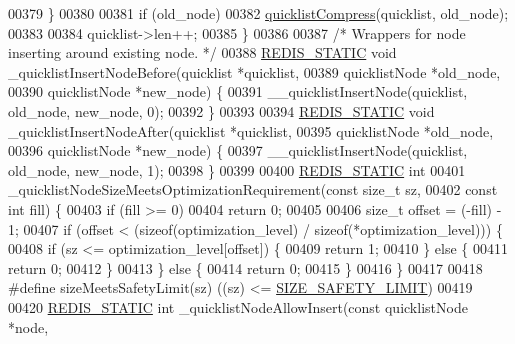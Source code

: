 \begin{DoxyCode}
{00379     \}
00380 
00381     \textcolor{keywordflow}{if} (old\_node)
00382         \hyperlink{quicklist_8c_a4711a946d258d25f4bedace1458a2a1c}{quicklistCompress}(quicklist, old\_node);
00383 
00384     quicklist->len++;
00385 \}
00386 
00387 \textcolor{comment}{/* Wrappers for node inserting around existing node. */}
00388 \hyperlink{quicklist_8c_a9c22c9c899458021930a552a4f94d317}{REDIS\_STATIC} \textcolor{keywordtype}{void} \_quicklistInsertNodeBefore(quicklist *quicklist,
00389                                              quicklistNode *old\_node,
00390                                              quicklistNode *new\_node) \{
00391     \_\_quicklistInsertNode(quicklist, old\_node, new\_node, 0);
00392 \}
00393 
00394 \hyperlink{quicklist_8c_a9c22c9c899458021930a552a4f94d317}{REDIS\_STATIC} \textcolor{keywordtype}{void} \_quicklistInsertNodeAfter(quicklist *quicklist,
00395                                             quicklistNode *old\_node,
00396                                             quicklistNode *new\_node) \{
00397     \_\_quicklistInsertNode(quicklist, old\_node, new\_node, 1);
00398 \}
00399 
00400 \hyperlink{quicklist_8c_a9c22c9c899458021930a552a4f94d317}{REDIS\_STATIC} \textcolor{keywordtype}{int}
00401 \_quicklistNodeSizeMeetsOptimizationRequirement(\textcolor{keyword}{const} size\_t sz,
00402                                                \textcolor{keyword}{const} \textcolor{keywordtype}{int} fill) \{
00403     \textcolor{keywordflow}{if} (fill >= 0)
00404         \textcolor{keywordflow}{return} 0;
00405 
00406     size\_t offset = (-fill) - 1;
00407     \textcolor{keywordflow}{if} (offset < (\textcolor{keyword}{sizeof}(optimization\_level) / \textcolor{keyword}{sizeof}(*optimization\_level))) \{
00408         \textcolor{keywordflow}{if} (sz <= optimization\_level[offset]) \{
00409             \textcolor{keywordflow}{return} 1;
00410         \} \textcolor{keywordflow}{else} \{
00411             \textcolor{keywordflow}{return} 0;
00412         \}
00413     \} \textcolor{keywordflow}{else} \{
00414         \textcolor{keywordflow}{return} 0;
00415     \}
00416 \}
00417 
00418 \textcolor{preprocessor}{#}\textcolor{preprocessor}{define} \textcolor{preprocessor}{sizeMeetsSafetyLimit}\textcolor{preprocessor}{(}\textcolor{preprocessor}{sz}\textcolor{preprocessor}{)} \textcolor{preprocessor}{(}\textcolor{preprocessor}{(}\textcolor{preprocessor}{sz}\textcolor{preprocessor}{)} \textcolor{preprocessor}{<=} \hyperlink{quicklist_8c_ae95e4d31b16c0e50720b8310df428c0e}{SIZE\_SAFETY\_LIMIT}\textcolor{preprocessor}{)}
00419 
00420 \hyperlink{quicklist_8c_a9c22c9c899458021930a552a4f94d317}{REDIS\_STATIC} \textcolor{keywordtype}{int} \_quicklistNodeAllowInsert(\textcolor{keyword}{const} quicklistNode *node,
}
\end{DoxyCode}
